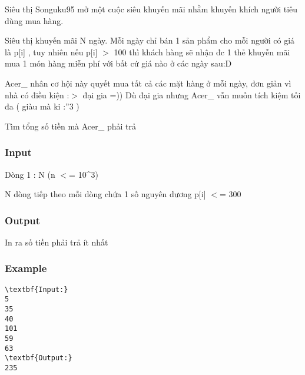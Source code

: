

Siêu thị Songuku95 mở một cuộc siêu khuyến mãi nhằm khuyến khích người tiêu dùng mua hàng.

Siêu thị khuyến mãi N ngày. Mỗi ngày chỉ bán 1 sản phẩm cho mỗi người có giá là p[i] , tuy nhiên nếu p[i] $>$ 100 thì khách hàng sẽ nhận đc 1 thẻ khuyễn mãi mua 1 món hàng miễn phí với bất cứ giá nào ở các ngày sau:D

Acer\_ nhân cơ hội này quyết mua tất cả các mặt hàng ở mỗi ngày, đơn giản vì nhà có điều kiện :$>$ đại gia =)) Dù đại gia nhưng Acer\_ vẫn muốn tích kiệm tối đa ( giàu mà ki :”3 )

Tìm tổng số tiền mà Acer\_ phải trả

\subsubsection{Input}

Dòng 1 : N (n $<$= 10\textasciicircum3)

N dòng tiếp theo mỗi dòng chứa 1 số nguyên dương p[i] $<$= 300

\subsubsection{Output}

In ra số tiền phải trả ít nhất

\subsubsection{Example}
\begin{verbatim}
\textbf{Input:}
5
35
40
101
59
63
\textbf{Output:}
235\end{verbatim}

 